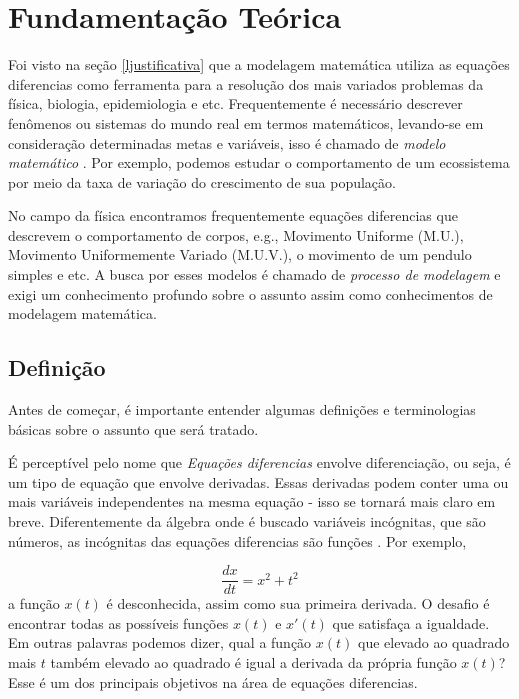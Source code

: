 \section{Fundamentação Teórica}\label{lfundamentacao}
Foi visto na seção \ref{ljustificativa} que a modelagem matemática 
utiliza as equações diferencias como ferramenta para a resolução dos 
mais variados problemas da física, biologia, epidemiologia e etc.
Frequentemente é necessário descrever fenômenos ou sistemas do mundo
real em termos matemáticos, levando-se em consideração determinadas metas
e variáveis, isso é chamado de \emph{modelo matemático} \cite{zill2003equacoes}.
Por exemplo, podemos estudar o comportamento de um ecossistema por meio da taxa
de variação do crescimento de sua população.

No campo da física encontramos frequentemente equações diferencias que descrevem
o comportamento de corpos, e.g., Movimento Uniforme (M.U.), Movimento Uniformemente
Variado (M.U.V.), o movimento de um pendulo simples e etc.
A busca por esses modelos é chamado de \emph{processo de modelagem} e exigi 
um conhecimento profundo sobre o assunto assim como conhecimentos de 
modelagem matemática.

\subsection{Definição}

Antes de começar, é importante entender algumas definições e terminologias 
básicas sobre o assunto que será tratado.

É perceptível pelo nome que \emph{Equações diferencias} envolve 
diferenciação, ou seja, é um tipo de equação que envolve derivadas.
Essas derivadas podem conter uma ou mais variáveis independentes na mesma 
equação - isso se tornará mais claro em breve. Diferentemente da álgebra onde
é buscado variáveis incógnitas, que são números, as incógnitas das equações diferencias são 
funções \cite{diacu}. Por exemplo,

\begin{equation*}
\frac{dx}{dt} = x^{2} + t^{2}
\end{equation*}
a função $x(t)$ é desconhecida, assim como sua primeira derivada. O desafio é
encontrar todas as possíveis funções $x(t)$ e $x'(t)$ que satisfaça a igualdade.
Em outras palavras podemos dizer, qual a função $x(t)$ que elevado ao quadrado mais
$t$ também elevado ao quadrado é igual a derivada da própria função $x(t)$?
Esse é um dos principais objetivos na área de equações diferencias.

